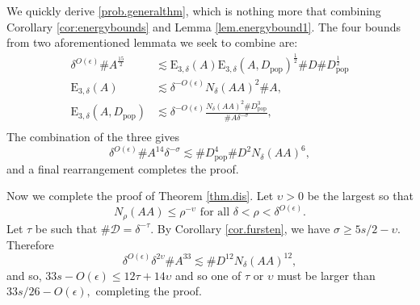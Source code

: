 \documentclass[12pt]{amsart}
\newcommand{\dem}{\de^{-O(\e)}}
\newcommand{\dep}{\de^{O(\e)}}
\newcommand{\pop}{D_{\mathrm{pop}}}
\newcommand{\1}{\mathbf{1}}
\newcommand{\en}[2]{\mathrm{E}_{#1,#2}}
\newcommand{\de}{\delta}
\newcommand{\e}{\epsilon}
\newcommand{\ups}{\upsilon}
\newcommand{\D}{\mathcal{D}}
\newcommand{\cns}[2]{N_{{#1}}({#2})}
\newcommand{\cn}[1]{N_\de({#1})}
\begin{document}
We quickly derive \eqref{prob.generalthm}, which is nothing more that combining Corollary \ref{cor:energybounds} and Lemma \ref{lem.energybound1}.
The four bounds from two aforementioned lemmata we seek to combine are: 
            \begin{align}
    			\delta^{O(\epsilon)} \# A ^{\frac{15}{2} }& \lesssim \mathrm{E} _{3,\delta} (A) \mathrm{E} _{3,\delta} (A, \pop )^{\frac{1}{2} } \# D \# \pop ^{\frac{1}{2} } \\
			\en 3 \de (A) &\lesssim \dem \cn{AA}^2 \#A,\\
            			\en 3 \de (A,\pop) &\lesssim \dem\frac{\cn{AA}^2 \#\pop^3 }{\#A\de^{-\sigma}},\\     
            \end{align}
            The combination of the three gives
            \begin{equation}
                \dep \#A^{14}\de^{-\sigma} \lesssim  \# \pop ^{4} \# D^2 \cn {AA}^{6},
            \end{equation}
            and a final rearrangement completes the proof.

    Now we complete the proof of Theorem \ref{thm.dis}. Let $\ups> 0$ be the largest so that 
	\begin{equation}
		\cns \rho {AA} \leq \rho^{- \ups} \text{ for all } \de < \rho < \dep. 
	\end{equation}
    Let $\tau$ be such that
    $\#\D = \de^{-\tau}.$ By Corollary \ref{cor.fursten}, we have $\sigma \geq 5s/2 -\ups.$ Therefore
	\begin{equation}
		    \dep \de^{2\ups}\# A^{33} \lesssim \# D^{12} \cn{AA}^{12},
	\end{equation}
and so,
$33s-O(\e) \leq 12\tau + 14\ups $
    and so
one of $\tau$ or $\ups$ must be larger than $33s/26 - O(\e),$
	completing the proof. 
\end{document}
